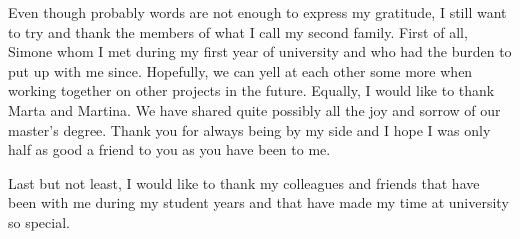 Even though probably words are not enough to express my gratitude, I still want to try and thank the members of what I call my second family.
First of all, Simone whom I met during my first year of university and who had the burden to put up with me since.
Hopefully, we can yell at each other some more when working together on other projects in the future.
Equally, I would like to thank Marta and Martina.
We have shared quite possibly all the joy and sorrow of our master's degree.
Thank you for always being by my side and I hope I was only half as good a friend to you as you have been to me.

Last but not least, I would like to thank my colleagues and friends that have been with me during my student years and that have made my time at university so special.


